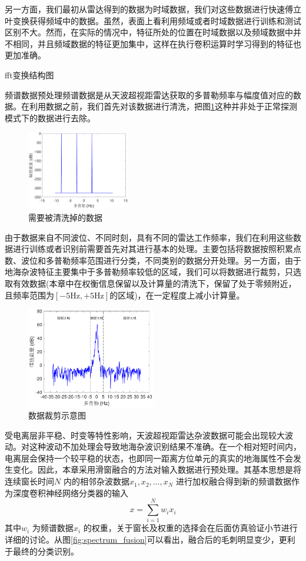 另一方面，我们最初从雷达得到的数据为时域数据，我们对这些数据进行快速傅立叶变换获得频域中的数据。虽然，表面上看利用频域或者时域数据进行训练和测试区别不大。然而，在实际的情况中，特征所处的位置在时域数据以及频域数据中并不相同，并且频域数据的特征更加集中，这样在执行卷积运算时学习得到的特征也更加准确。

fft变换结构图

频谱数据预处理频谱数据是从天波超视距雷达获取的多普勒频率与幅度值对应的数据。在利用数据之前，我们首先对该数据进行清洗，把图\ref{fig:delete}这种并非处于正常探测模式下的数据进行去除。 

\begin{figure}[H]
	\centering
	\includegraphics[width=0.4\textwidth]{figures/othr/delete}
	\caption{需要被清洗掉的数据}
	\label{fig:delete}
\end{figure}

由于数据来自不同波位、不同时刻，具有不同的雷达工作频率，我们在利用这些数据进行训练或者识别前需要首先对其进行基本的处理。主要包括将数据按照积累点数、波位和多普勒频率范围进行分类，不同类别的数据分开处理。另一方面，由于地海杂波特征主要集中于多普勒频率较低的区域，我们可以将数据进行裁剪，只选取有效数据(本章中在权衡信息保留以及计算量的清洗下，保留了处于零频附近，且频率范围为$[-5\text{Hz},+5\text{Hz}]$的区域)，在一定程度上减小计算量。 

\begin{figure}[H]
	\centering
	\includegraphics[width=0.5\textwidth]{figures/othr/cut}
	\caption{数据裁剪示意图}
	\label{fig:cut}
\end{figure}

受电离层非平稳、时变等特性影响，天波超视距雷达杂波数据可能会出现较大波动。对这种波动不加处理会导致地海杂波识别结果不准确。在一个相对短时间内，电离层会保持一个较平稳的状态，也即同一距离方位单元的真实的地海属性不会发生变化。因此，本章采用滑窗融合的方法对输入数据进行预处理。其基本思想是将连续窗长时间$N$ 内的相邻杂波数据$x_1,x_2,\dots,x_N$ 进行加权融合得到新的频谱数据作为深度卷积神经网络分类器的输入
\begin{equation}
	x=\sum_{i=1}^N w_ix_i
	\label{equ:window_fusion}
\end{equation}
其中$w_i$ 为频谱数据$x_i$ 的权重，关于窗长及权重的选择会在后面仿真验证小节进行详细的讨论。从图\ref{fig:spectrum_fusion}可以看出，融合后的毛刺明显变少，更利于最终的分类识别。

